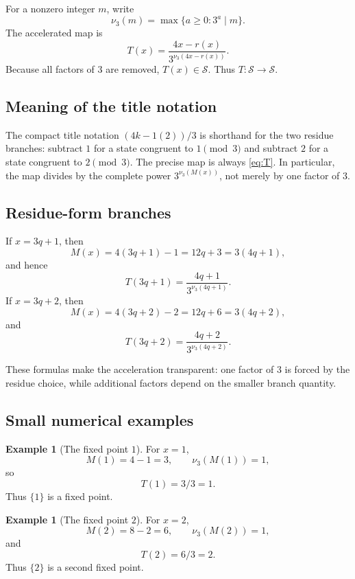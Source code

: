 \documentclass[11pt]{article}
\theoremstyle{definition}
\newtheorem{example}[theorem]{Example}
\theoremstyle{remark}
\newcommand{\vthree}{\nu_3}
\newcommand{\Sset}{\mathcal S}
\begin{document}
For a nonzero integer $m$, write
\[
\vthree(m)=\max\{a\ge0:3^a\mid m\}.
\]
The accelerated map is
\begin{equation}
\boxed{
T(x)=\frac{4x-r(x)}{3^{\vthree(4x-r(x))}}.
}
\label{eq:T}
\end{equation}
Because all factors of $3$ are removed, $T(x)\in\Sset$.  Thus $T:\Sset\to\Sset$.

\subsection{Meaning of the title notation}

The compact title notation $(4k-1(2))/3$ is shorthand for the two residue branches:
subtract $1$ for a state congruent to $1\pmod3$ and subtract $2$ for a state congruent to $2\pmod3$.  The precise map is always \eqref{eq:T}.  In particular, the map divides by the complete power $3^{\vthree(M(x))}$, not merely by one factor of $3$.

\subsection{Residue-form branches}

If $x=3q+1$, then
\[
M(x)=4(3q+1)-1=12q+3=3(4q+1),
\]
and hence
\begin{equation}
T(3q+1)=\frac{4q+1}{3^{\vthree(4q+1)}}.
\label{eq:branch1}
\end{equation}
If $x=3q+2$, then
\[
M(x)=4(3q+2)-2=12q+6=3(4q+2),
\]
and
\begin{equation}
T(3q+2)=\frac{4q+2}{3^{\vthree(4q+2)}}.
\label{eq:branch2}
\end{equation}

These formulas make the acceleration transparent: one factor of $3$ is forced by the residue choice, while additional factors depend on the smaller branch quantity.

\subsection{Small numerical examples}

\begin{example}[The fixed point $1$]
For $x=1$,
\[
M(1)=4-1=3,\qquad \vthree(M(1))=1,
\]
so
\[
T(1)=3/3=1.
\]
Thus $\{1\}$ is a fixed point.
\end{example}

\begin{example}[The fixed point $2$]
For $x=2$,
\[
M(2)=8-2=6,\qquad \vthree(M(2))=1,
\]
and
\[
T(2)=6/3=2.
\]
Thus $\{2\}$ is a second fixed point.
\end{example}
\end{document}
